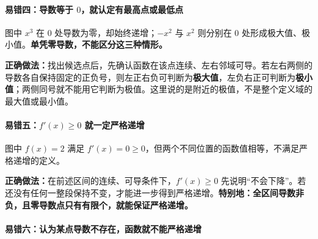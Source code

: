 \begin{trapbox}
\par\medskip
\noindent\begin{minipage}{\linewidth}
\paragraph{易错四：导数等于 $0$，就认定有最高点或最低点}
\begin{center}\end{center}
\end{minipage}\par\medskip
图中 $x^3$ 在 $0$ 处导数为零，却始终递增；$-x^2$ 与 $x^2$ 则分别在 $0$ 处形成极大值、极小值。\textbf{单凭零导数，不能区分这三种情形。}

\textbf{正确做法：}找出候选点后，先确认函数在该点连续、左右邻域可导。若左右两侧的导数各自保持固定的正负号，则左正右负可判断为\textbf{极大值}，左负右正可判断为\textbf{极小值}；两侧同号就不能用它判断为极值。这里说的是附近的极值，不是整个定义域的最大值或最小值。

\par\medskip
\noindent\begin{minipage}{\linewidth}
\paragraph{易错五：$f'(x)\ge0$ 就一定严格递增}
\begin{center}\end{center}
\end{minipage}\par\medskip
图中 $f(x)=2$ 满足 $f'(x)=0\ge0$，但两个不同位置的函数值相等，不满足严格递增的定义。

\textbf{正确做法：}在前述区间的连续、可导条件下，$f'(x)\ge0$ 先说明``不会下降''。若还没有任何一整段保持不变，才能进一步得到严格递增。\textbf{特别地：全区间导数非负，且零导数点只有有限个，就能保证严格递增。}


\par\medskip
\noindent\begin{minipage}{\linewidth}
\paragraph{易错六：认为某点导数不存在，函数就不能严格递增}
\begin{center}\end{center}
\end{minipage}\par\medskip


\end{trapbox}
